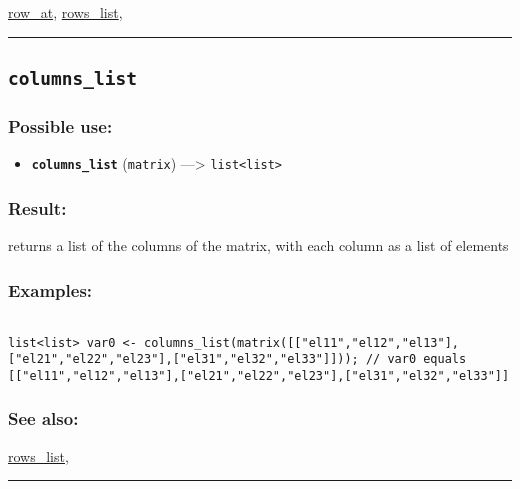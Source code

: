 \documentclass[]{book}
\providecommand{\tightlist}{%
  \setlength{\itemsep}{0pt}\setlength{\parskip}{0pt}}
\theoremstyle{definition}
\theoremstyle{definition}
\theoremstyle{definition}
\theoremstyle{remark}
\begin{document}
\href{OperatorsNR\#row_at}{row\_at},
\href{OperatorsNR\#rows_list}{rows\_list},

\begin{center}\rule{0.5\linewidth}{\linethickness}\end{center}

\subsection{\texorpdfstring{\texttt{columns\_list}}{columns\_list}}\label{columns_list}

\subsubsection{Possible use:}\label{possible-use-92}

\begin{itemize}
\tightlist
\item
  \textbf{\texttt{columns\_list}} (\texttt{matrix}) ---\textgreater{}
  \texttt{list\textless{}list\textgreater{}}
\end{itemize}

\subsubsection{Result:}\label{result-90}

returns a list of the columns of the matrix, with each column as a list
of elements

\subsubsection{Examples:}\label{examples-71}

\begin{verbatim}
 
list<list> var0 <- columns_list(matrix([["el11","el12","el13"],["el21","el22","el23"],["el31","el32","el33"]])); // var0 equals [["el11","el12","el13"],["el21","el22","el23"],["el31","el32","el33"]]
\end{verbatim}

\subsubsection{See also:}\label{see-also-57}

\href{OperatorsNR\#rows_list}{rows\_list},

\begin{center}\rule{0.5\linewidth}{\linethickness}\end{center}
\end{document}

